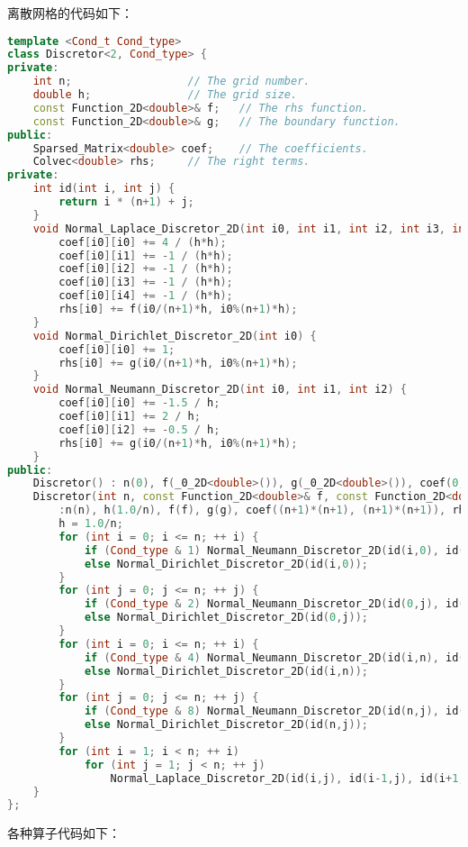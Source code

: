 \documentclass{ctexart}
\begin{document}
离散网格的代码如下：

\begin{lstlisting}[language=c++]
template <Cond_t Cond_type>
class Discretor<2, Cond_type> {
private:
	int n;					// The grid number.
	double h;				// The grid size.
	const Function_2D<double>& f;	// The rhs function.
	const Function_2D<double>& g;	// The boundary function.
public:
	Sparsed_Matrix<double> coef;	// The coefficients.
	Colvec<double> rhs;		// The right terms.
private:
	int id(int i, int j) {
		return i * (n+1) + j;
	}
	void Normal_Laplace_Discretor_2D(int i0, int i1, int i2, int i3, int i4) {
		coef[i0][i0] += 4 / (h*h);
		coef[i0][i1] += -1 / (h*h);
		coef[i0][i2] += -1 / (h*h);
		coef[i0][i3] += -1 / (h*h);
		coef[i0][i4] += -1 / (h*h);
		rhs[i0] += f(i0/(n+1)*h, i0%(n+1)*h);
	}
	void Normal_Dirichlet_Discretor_2D(int i0) {
		coef[i0][i0] += 1;
		rhs[i0] += g(i0/(n+1)*h, i0%(n+1)*h);
	}
	void Normal_Neumann_Discretor_2D(int i0, int i1, int i2) {
		coef[i0][i0] += -1.5 / h;
		coef[i0][i1] += 2 / h;
		coef[i0][i2] += -0.5 / h;
		rhs[i0] += g(i0/(n+1)*h, i0%(n+1)*h);
	}
public:
	Discretor() : n(0), f(_0_2D<double>()), g(_0_2D<double>()), coef(0, 0), rhs(0) {}
	Discretor(int n, const Function_2D<double>& f, const Function_2D<double>& g)
		:n(n), h(1.0/n), f(f), g(g), coef((n+1)*(n+1), (n+1)*(n+1)), rhs((n+1)*(n+1)) {
		h = 1.0/n;
		for (int i = 0; i <= n; ++ i) {
			if (Cond_type & 1) Normal_Neumann_Discretor_2D(id(i,0), id(i,1), id(i,2));
			else Normal_Dirichlet_Discretor_2D(id(i,0));
		}
		for (int j = 0; j <= n; ++ j) {
			if (Cond_type & 2) Normal_Neumann_Discretor_2D(id(0,j), id(1,j), id(2,j));
			else Normal_Dirichlet_Discretor_2D(id(0,j));
		}
		for (int i = 0; i <= n; ++ i) {
			if (Cond_type & 4) Normal_Neumann_Discretor_2D(id(i,n), id(i,n-1), id(i,n-2));
			else Normal_Dirichlet_Discretor_2D(id(i,n));
		}
		for (int j = 0; j <= n; ++ j) {
			if (Cond_type & 8) Normal_Neumann_Discretor_2D(id(n,j), id(n-1,j), id(n-2,j));
			else Normal_Dirichlet_Discretor_2D(id(n,j));
		}
		for (int i = 1; i < n; ++ i)
			for (int j = 1; j < n; ++ j)
				Normal_Laplace_Discretor_2D(id(i,j), id(i-1,j), id(i+1,j), id(i,j-1), id(i,j+1));
	}
};
\end{lstlisting}

各种算子代码如下：
\end{document}
